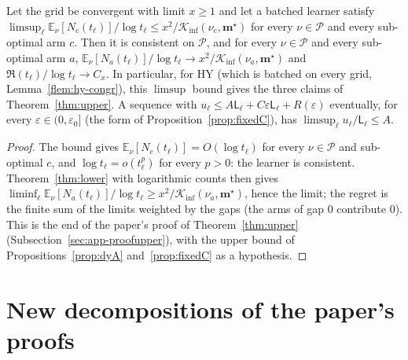 \documentclass[11pt]{article}
\newcommand{\E}{\mathbb{E}}
\newcommand{\Kinf}{\mathcal K_{\inf}}
\newcommand{\cP}{\mathcal P}
\begin{document}
\begin{lemma}\label{flem:upper-assembly}
Let the grid be convergent with limit $x\ge1$ and let a batched learner satisfy
$\limsup_\ell\E_\nu[N_c(t_\ell)]/\log t_\ell\le x^2/\Kinf(\nu_c,\mathbf m^\star)$ for every $\nu\in\cP$
and every sub-optimal arm $c$. Then it is consistent on $\cP$, and for every $\nu\in\cP$ and every
sub-optimal arm $a$, $\E_\nu[N_a(t_\ell)]/\log t_\ell\to x^2/\Kinf(\nu_a,\mathbf m^\star)$ and
$\mathfrak R(t_\ell)/\log t_\ell\to C_x$. In particular, for HY (which is batched on every grid,
Lemma~\ref{flem:hy-congr}), this $\limsup$ bound gives the three claims of
Theorem~\ref{thm:upper}. A sequence with $u_\ell\le A\mathsf L_\ell+C\varepsilon\mathsf L_\ell+R(\varepsilon)$ eventually, for every
$\varepsilon\in(0,\varepsilon_0]$ (the form of Proposition~\ref{prop:fixedC}), has $\limsup_\ell u_\ell/\mathsf L_\ell\le A$.
\end{lemma}

\begin{proof}
The bound gives $\E_\nu[N_c(t_\ell)]=O(\log t_\ell)$ for every $\nu\in\cP$ and sub-optimal $c$, and
$\log t_\ell=o(t_\ell^p)$ for every $p>0$: the learner is consistent. Theorem~\ref{thm:lower} with
logarithmic counts then gives $\liminf_\ell\E_\nu[N_a(t_\ell)]/\log t_\ell\ge
x^2/\Kinf(\nu_a,\mathbf m^\star)$, hence the limit; the regret is the finite sum of the limits
weighted by the gaps (the arms of gap $0$ contribute $0$). This is the end of the paper's proof of
Theorem~\ref{thm:upper} (Subsection~\ref{sec:app-proofupper}), with the upper bound of
Propositions~\ref{prop:dyA} and~\ref{prop:fixedC} as a hypothesis.
\end{proof}

\section{New decompositions of the paper's proofs}
\end{document}
